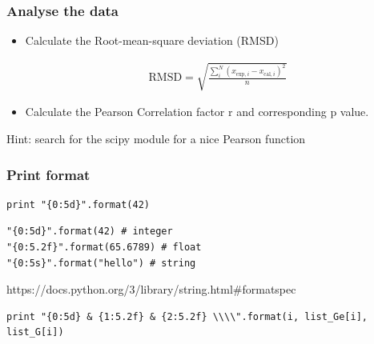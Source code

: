 \begin{frame}[fragile]

    \frametitle{Analyse the data}

    \begin{itemize}
        \item Calculate the Root-mean-square deviation (RMSD)

        \begin{align*}
            \mathrm{RMSD} = \sqrt{\frac{\sum_i^N (x_{\mathrm{exp},i}-x_{\mathrm{cal},i})^2 }{n}}
        \end{align*}

    \end{itemize}

    \begin{itemize}
        \item Calculate the Pearson Correlation factor r and corresponding p value.
    \end{itemize}

    \bigskip

    Hint: search for the scipy module for a nice Pearson function

\end{frame}


\begin{frame}[fragile]

    \frametitle{Print format}

\begin{lstlisting}
print "{0:5d}".format(42)
\end{lstlisting}

\bigskip

\begin{lstlisting}
"{0:5d}".format(42) # integer
"{0:5.2f}".format(65.6789) # float
"{0:5s}".format("hello") # string
\end{lstlisting}

\bigskip

https://docs.python.org/3/library/string.html\#formatspec

\bigskip

\begin{lstlisting}
print "{0:5d} & {1:5.2f} & {2:5.2f} \\\\".format(i, list_Ge[i], list_G[i])
\end{lstlisting}


\end{frame}


